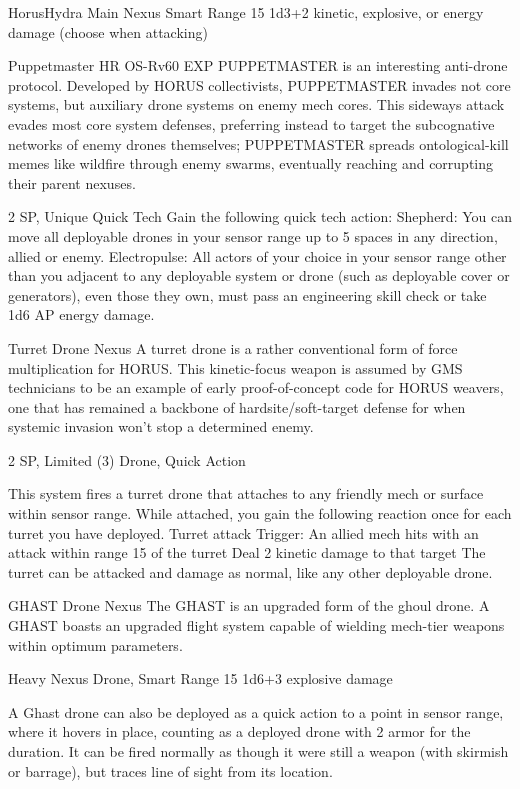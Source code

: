 \begin{mech}{Horus}{Hydra}
Main Nexus
Smart
Range 15
1d3+2 kinetic, explosive, or energy damage (choose when attacking)

Puppetmaster
HR OS-Rv60 EXP PUPPETMASTER is an interesting anti-drone protocol. Developed by HORUS collectivists, PUPPETMASTER invades not core systems, but auxiliary drone systems on enemy mech cores. This sideways attack evades most core system defenses, preferring instead to target the subcognative networks of enemy drones themselves; PUPPETMASTER spreads ontological-kill memes like wildfire through enemy swarms, eventually reaching and corrupting their parent nexuses.

2 SP, Unique
Quick Tech
Gain the following quick tech action:
Shepherd: You can move all deployable drones in your sensor range up to 5 spaces in any direction, allied or enemy.
Electropulse: All actors of your choice in your sensor range other than you adjacent to any deployable system or drone (such as deployable cover or generators), even those they own, must pass an engineering skill check or take 1d6 AP energy damage.

Turret Drone Nexus
A turret drone is a rather conventional form of force multiplication for HORUS. This kinetic-focus weapon is assumed by GMS technicians to be an example of early proof-of-concept code for HORUS weavers, one that has remained a backbone of hardsite/soft-target defense for when systemic invasion won’t stop a determined enemy.

2 SP, Limited (3)
Drone, Quick Action

This system fires a turret drone that attaches to any friendly mech or surface within sensor range. While attached, you gain the following reaction once for each turret you have deployed.
	Turret attack
	Trigger: An allied mech hits with an attack within range 15 of the turret
	Deal 2 kinetic damage to that target
The turret can be attacked and damage as normal, like any other deployable drone.

GHAST Drone Nexus
The GHAST is an upgraded form of the ghoul drone. A GHAST boasts an upgraded flight system capable of wielding mech-tier weapons within optimum parameters.

Heavy Nexus
Drone, Smart
Range 15
1d6+3 explosive damage

A Ghast drone can also be deployed as a quick action to a point in sensor range, where it hovers in place, counting as a deployed drone with 2 armor for the duration. It can be fired normally as though it were still a weapon (with skirmish or barrage), but traces line of sight from its location.


\end{mech}
